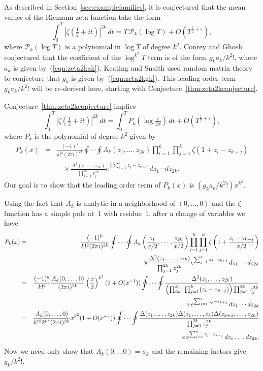 \documentclass[12pt,letterpaper]{amsart}
\theoremstyle{plain}
\theoremstyle{definition}
\theoremstyle{remark}
\numberwithin{equation}{subsection}
\numberwithin{theorem}{subsection}
\numberwithin{table}{subsection}
\def\({\left(}
\def\){\right)}
\begin{document}
As described in Section~\ref{sec:examplefamilies}, it is
conjectured that the mean values of the Riemann zeta function take
the form
\begin{equation}  \int_0^T |\zeta(\tfrac12 +it)|^{2k}\,dt  = T \, {\mathcal P}_{k}(\log T) +O(T^{\frac12 +\varepsilon}),
\end{equation}
where ${\mathcal P}_k(\log T)$ is a polynomial in $\log T$ of
degree $k^2$. Conrey and Ghosh conjectured that the
coefficient of the $\log ^{k^2} T$ term is of the form $g_ka_k/k^2!$,
where $a_k$ is given by~(\ref{eqn:zeta2kak}).  Keating and Snaith
used random matrix theory to conjecture that
$g_k$ is given by~(\ref{eqn:zeta2kgk}).
This leading order term $g_ka_k/k^2!$ will be re-derived
here, starting with Conjecture~\ref{thm:zeta2kconjecture}.

Conjecture~\ref{thm:zeta2kconjecture} implies
\begin{equation}
\int_{0}^T |\zeta(\tfrac12 +it)|^{2k}\,dt= \int_0^T
P_k\left(\log \tfrac{t}{2 \pi}\right) \,dt
+
O(T^{\frac{1}{2}+\varepsilon}) ,
\end{equation}
where $P_k$ is the polynomial of degree $k^2$ given by 
\begin{eqnarray}
P_k(x)&  = &\frac{(-1)^k}{k!^2(2\pi
i)^{2k}}\oint \cdots \oint A_k(z_1,\ldots,z_{2k}) \prod_{i=1}^k
\prod_{j=1}^k \zeta(1+z_i-z_{k+j})\nonumber \\&   &\ \ \ \ \times
\frac{ \Delta^2(z_1,\ldots,z_{2k})} {\prod_{j=1}^{2k} z_j^{2k}}
e^{\tfrac{x}{2} \sum_{j=1}^kz_j-z_{k+j}}\, dz_1\cdots dz_{2k} .
\end{eqnarray}
Our goal is to show that the leading order term of $P_k(x)$
is $(g_ka_k/k^2!) x^{k^2}$.

Using the fact that $A_k$ is analytic in a neighborhood of
$(0,\dots,0)$ and the $\zeta$-function has a simple pole at~$1$ with
residue~$1$, after a change of variables we have
\begin{eqnarray}
P_k(x)
&  = &\frac{(-1)^k}{k!^2(2\pi i)^{2k}} \oint \cdots
\oint A_k\(\frac{z_1}{x/2},\cdots,\frac{z_{2k}}{x/2}\)
\prod_{i=1}^k \prod_{j=1}^k
\zeta\(1+\frac{z_i- z_{k+j}}{x/2}\)\nonumber \\
&   &\ \
\ \ \times \frac{ \Delta^2(z_1,\ldots,z_{2k})} {\prod_{j=1}^{2k}
z_j^{2k}} e^{\sum_{j=1}^kz_j-z_{k+j}} \, dz_1\cdots dz_{2k} \cr
&  = & \frac{(-1)^k}{k!^2}\frac{A_k(0,\dots,0)}{(2\pi i)^{2k}} 
\(\frac{x}{2}\)^{k^2} 
(1+O(x^{-1}))
\oint \cdots \oint 
\frac{\Delta^2(z_1,\ldots,z_{2k}) } {\left(
\prod_{i=1}^k\prod_{j=1}^k (z_{i}-z_{k+j})\right) \prod_{j=1}^{2k}
z_j^{2k}} \nonumber \\&   &\ \ \ \ \ \ \ \times e^{\sum_{j=1}^k
z_j-z_{k+j}} \,dz_1\cdots dz_{2k} \nonumber \\&  =
&\frac{A_k(0,\dots,0)}{k!^2 2^{k^2} (2\pi i)^{2k} } x^{k^2} 
(1+O(x^{-1}))
\oint \cdots \oint 
\frac{\Delta(z_1,\ldots,z_{2k}) \Delta(z_1,\ldots,z_k)
\Delta(z_{k+1},\ldots,z_{2k}) } {\prod_{j=1}^{2k}
z_j^{2k}}\nonumber \\&   &\ \ \ \ \ \ \ \times
e^{\sum_{j=1}^kz_j-z_{k+j}} \, dz_1\ldots,dz_{2k}. 
\end{eqnarray}
Now we need only show that $A_k(0,\ldots0)=a_k$ and the remaining
factors give $g_k/k^2!$.
\end{document}

